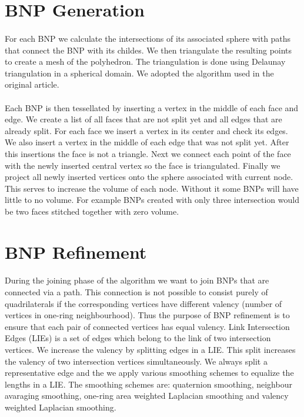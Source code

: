 \section{BNP Generation}

\paragraph{}
For each BNP we calculate the intersections of its associated sphere with paths that connect the BNP with its childes. We then triangulate the resulting points to create a mesh of the polyhedron. The triangulation is done using Delaunay triangulation in a spherical domain. We adopted the algorithm used in the original article. 
\paragraph{}
Each BNP is then tessellated by inserting a vertex in the middle of each face and edge. We create a list of all faces that are not split yet and all edges that are already split. For each face we insert a vertex in its center and check its edges. We also insert a vertex in the middle of each edge that was not split yet. After this insertions the face is not a triangle. Next we connect each point of the face with the newly inserted central vertex so the face is triangulated. Finally we project all newly inserted vertices onto the sphere associated with current node. This serves to increase the volume of each node. Without it some BNPs will have little to no volume. For example BNPs created with only three intersection would be two faces stitched together with zero volume.

\section{BNP Refinement}

\paragraph{}
During the joining phase of the algorithm we want to join BNPs that are connected via a path. This connection is not possible to consist purely of quadrilaterals if the corresponding vertices have different valency (number of vertices in one-ring neighbourhood). Thus the purpose of BNP refinement is to ensure that each pair of connected vertices has equal valency. Link Intersection Edges (LIEs) is a set of edges which belong to the link of two intersection vertices. We increase the valency by splitting edges in a LIE. This split increases the valency of two intersection vertices simultaneously. We always split a representative edge and the we apply various smoothing schemes to equalize the lengths in a LIE. The smoothing schemes are: quaternion smoothing, neighbour avaraging smoothing, one-ring area weighted Laplacian smoothing and valency weighted Laplacian smoothing.
